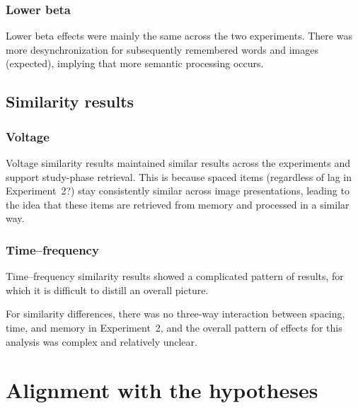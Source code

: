 \subsubsection{Lower beta}

Lower beta effects were mainly the same across the two experiments.  There was more desynchronization for subsequently remembered words and images (expected), implying that more semantic processing occurs.

\subsection{Similarity results}

\subsubsection{Voltage}

Voltage similarity results maintained similar results across the experiments and support study-phase retrieval.  This is because spaced items (regardless of lag in Experiment~2?) stay consistently similar across image presentations, leading to the idea that these items are retrieved from memory and processed in a similar way.

\subsubsection{Time--frequency}

Time--frequency similarity results showed a complicated pattern of results, for which it is difficult to distill an overall picture.

For similarity differences, there was no three-way interaction between spacing, time, and memory in Experiment~2, and the overall pattern of effects for this analysis was complex and relatively unclear.



\section{Alignment with the hypotheses}


